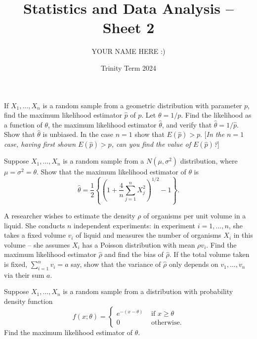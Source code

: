 \documentclass[answers]{exam}
\title{Statistics and Data Analysis -- Sheet 2}
\author{YOUR NAME HERE :)}
\date{Trinity Term 2024}
\begin{document}
\maketitle
\begin{questions}

\question%
\begin{subparts}
\subpart If $X_{1}, \ldots, X_{n}$ is a random sample from a geometric distribution with parameter $p$, find the maximum likelihood estimator $\widehat{p}$ of $p$.
\subpart Let $\theta=1 / p$. Find the likelihood as a function of $\theta$, the maximum likelihood estimator $\widehat{\theta}$, and verify that $\widehat{\theta}=1 / \widehat{p}$.
\subpart Show that $\widehat{\theta}$ is unbiased. In the case $n=1$ show that $E(\widehat{p})>p$. [\emph{In the $n=1$ case, having first shown $E(\widehat{p})>p$, can you find the value of $E(\widehat{p})$?}]
\end{subparts}



\question%
Suppose $X_{1}, \ldots, X_{n}$ is a random sample from a $N\left(\mu, \sigma^{2}\right)$ distribution, where $\mu=\sigma^{2}=\theta$. Show that the maximum likelihood estimator of $\theta$ is \[
	\widehat{\theta}=\frac{1}{2}\left\{\left(1+\frac{4}{n} \sum_{j=1}^{n} X_{j}^{2}\right)^{1 / 2}-1\right\} .
\]



\question%
A researcher wishes to estimate the density $\rho$ of organisms per unit volume in a liquid. She conducts $n$ independent experiments: in experiment $i=1, \ldots, n$, she takes a fixed volume $v_{i}$ of liquid and measures the number of organisms $X_{i}$ in this volume -- she assumes $X_{i}$ has a Poisson distribution with mean $\rho v_{i}$. Find the maximum likelihood estimator $\widehat{\rho}$ and find the bias of $\widehat{\rho}$. If the total volume taken is fixed, $\sum_{i=1}^{n} v_{i}=a$ say, show that the variance of $\widehat{\rho}$ only depends on $v_{1}, \ldots, v_{n}$ via their sum $a$.



\question%
Suppose $X_{1}, \ldots, X_{n}$ is a random sample from a distribution with probability density function \[
	f(x ; \theta)= \begin{cases}e^{-(x-\theta)} & \text { if } x \geqslant \theta \\ 0 & \text { otherwise.}\end{cases}
\] Find the maximum likelihood estimator of $\theta$.




\end{questions}
\end{document}
